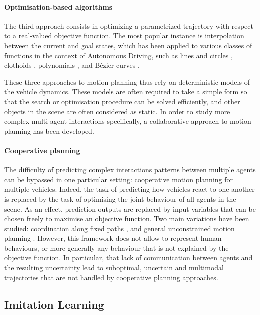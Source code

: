 \paragraph{Optimisation-based algorithms}

The third approach consists in optimizing a parametrized trajectory with respect to a real-valued objective function. The most popular instance is interpolation between the current and goal states, which has been applied to various classes of functions in the context of Autonomous Driving, such as lines and circles \citep{Reeds1990}, clothoids \citep{Funke2012}, polynomials \citep{Xu2012}, and Bézier curves \citep{Gonzalez2016}.

These three approaches to motion planning thus rely on deterministic models of the vehicle dynamics. These models are often required to take a simple form so that the search or optimisation procedure can be solved efficiently, and other objects in the scene are often considered as static. In order to study more complex multi-agent interactions specifically, a collaborative approach to motion planning has been developed.

\paragraph{Cooperative planning}

The difficulty of predicting complex interactions patterns between multiple agents can be bypassed in one particular setting: cooperative motion planning for multiple vehicles. Indeed, the task of predicting how vehicles react to one another is replaced by the task of optimising the joint behaviour of all agents in the scene. As an effect, prediction outputs are replaced by input variables that can be chosen freely to maximise an objective function. Two main variations have been studied: coordination along fixed paths \citep{Altche2016,Altche2016b,Altche2017}, and general unconstrained motion planning \citep{LaValle1998}.
However, this framework does not allow to represent human behaviours, or more generally any behaviour that is not explained by the objective function. In particular, that lack of communication between agents and the resulting uncertainty lead to suboptimal, uncertain and multimodal trajectories that are not handled by cooperative planning approaches.


\subsection{Imitation Learning}
\label{sec:imitation-learning}

